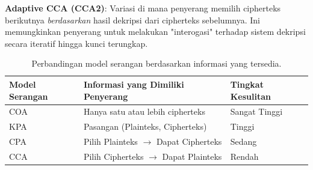 \textbf{Adaptive CCA (CCA2)}: Variasi di mana penyerang memilih cipherteks berikutnya \textit{berdasarkan} hasil dekripsi dari cipherteks sebelumnya. Ini memungkinkan penyerang untuk melakukan "interogasi" terhadap sistem dekripsi secara iteratif hingga kunci terungkap.

\begin{table}[htbp]
\centering
\small
\begin{tabular}{|l|p{6cm}|l|}
\hline
\textbf{Model Serangan} & \textbf{Informasi yang Dimiliki Penyerang} & \textbf{Tingkat Kesulitan} \\ \hline
COA & Hanya satu atau lebih cipherteks & Sangat Tinggi \\ \hline
KPA & Pasangan (Plainteks, Cipherteks) & Tinggi \\ \hline
CPA & Pilih Plainteks $\to$ Dapat Cipherteks & Sedang \\ \hline
CCA & Pilih Cipherteks $\to$ Dapat Plainteks & Rendah \\ \hline
\end{tabular}
\caption{Perbandingan model serangan berdasarkan informasi yang tersedia.}
\end{table}
